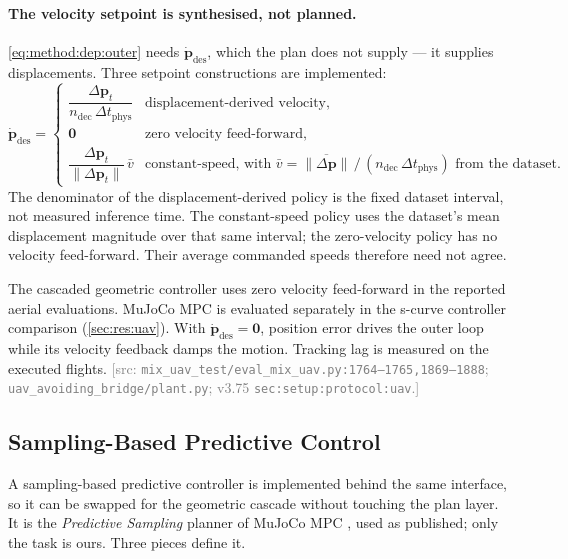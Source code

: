 \documentclass[headsepline,footsepline,footinclude=false,oneside,fontsize=11pt,paper=a4,listof=totoc,bibliography=totoc]{scrbook}
\theoremstyle{definition}
\theoremstyle{plain}
\theoremstyle{remark}
\newcommand{\vect}[1]{\boldsymbol{#1}}
\newcommand{\sidx}[1]{_{\textrm{#1}}}
\newif\ifsubmission
\newcommand{\srcnote}[1]{\ifsubmission\else\textcolor{gray}{\footnotesize\textsf{[src: #1]}}\fi}
\begin{document}
\paragraph{The velocity setpoint is synthesised, not planned.} \eqref{eq:method:dep:outer} needs
$\dot{\vect{p}}\sidx{des}$, which the plan does not supply --- it supplies displacements. Three
setpoint constructions are implemented:
\begin{equation}\label{eq:method:dep:vdes}
  \dot{\vect{p}}\sidx{des} =
  \begin{cases}
    \dfrac{\Delta\vect{p}_{t}}{n\sidx{dec}\,\Delta t\sidx{phys}} & \text{displacement-derived velocity,}\\
    \vect{0} & \text{zero velocity feed-forward,}\\
    \dfrac{\Delta\vect{p}_{t}}{\|\Delta\vect{p}_{t}\|}\,\bar{v} & \text{constant-speed, with }
      \bar{v} = \overline{\|\Delta\vect{p}\|}\,/\,(n\sidx{dec}\,\Delta t\sidx{phys})\text{ from the dataset.}
  \end{cases}
\end{equation}
The denominator of the displacement-derived policy is the fixed dataset interval, not measured
inference time. The constant-speed policy uses the dataset's mean displacement magnitude over that
same interval; the zero-velocity policy has no velocity feed-forward. Their average commanded
speeds therefore need not agree.

The cascaded geometric controller uses zero velocity feed-forward in the reported aerial evaluations.
MuJoCo MPC is evaluated separately in the s-curve controller comparison
(\autoref{sec:res:uav}). With $\dot{\vect{p}}\sidx{des}=\vect{0}$, position error drives the outer
loop while its velocity feedback damps the motion. Tracking lag is measured on the executed flights.
\srcnote{\texttt{mix\_uav\_test/eval\_mix\_uav.py:1764--1765,1869--1888};
\texttt{uav\_avoiding\_bridge/plant.py}; v3.75 \texttt{sec:setup:protocol:uav}.}

\subsection{Sampling-Based Predictive Control}\label{sec:method:mjpc}

A sampling-based predictive controller is
implemented behind the same interface, so it can be swapped for the geometric cascade without
touching the plan layer. It is the \emph{Predictive Sampling} planner of MuJoCo MPC \parencite{howell2022predictive}, used
as published; only the task is ours. Three pieces define it.
\end{document}
